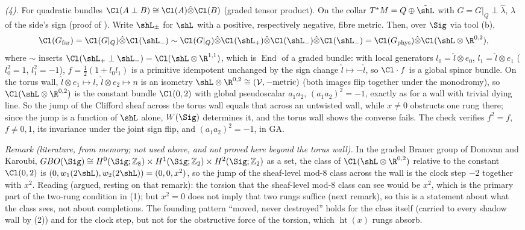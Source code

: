 \emph{(4).} For quadratic bundles $\Cl(A \perp B) \cong \Cl(A) \hat\otimes \Cl(B)$ (graded tensor product). On the collar $T^*M = Q \oplus \tilde\shL$ with $G = G|_Q \perp \hat\lambda$, $\hat\lambda$ of the side's sign (proof of ). Write $\shL_\pm$ for $\shL$ with a positive, respectively negative, fibre metric. Then, over $\Sig$ via tool (b),
\[
\Cl(G_{\mathrm{far}}) = \Cl(G|_Q) \hat\otimes \Cl(\shL_-) \sim \Cl(G|_Q) \hat\otimes \Cl(\shL_+) \hat\otimes \Cl(\shL_-) \hat\otimes \Cl(\shL_-) = \Cl(G_{\mathrm{phys}}) \hat\otimes \Cl(\shL \otimes \R^{0,2}),
\]
where $\sim$ inserts $\Cl(\shL_+ \perp \shL_-) = \Cl(\shL \otimes \R^{1,1})$, which is $\operatorname{End}$ of a graded bundle: with local generators $l_0 = \hat l \otimes e_0$, $l_1 = \hat l \otimes e_1$ ($l_0^2 = 1$, $l_1^2 = -1$), $f = \frac12(1 + l_0 l_1)$ is a primitive idempotent unchanged by the sign change $\hat l \mapsto -\hat l$, so $\Cl \cdot f$ is a global spinor bundle. On the torus wall, $\hat l \otimes e_1 \mapsto l$, $\hat l \otimes e_2 \mapsto n$ is an isometry $\shL \otimes \R^{0,2} \cong (\mathcal V, -\text{metric})$ (both images flip together under the monodromy), so $\Cl(\shL \otimes \R^{0,2})$ is the constant bundle $\Cl(0,2)$ with global pseudoscalar $a_1 a_2$, $(a_1 a_2)^2 = -1$, exactly as for a wall with trivial dying line. So the jump of the Clifford sheaf across the torus wall equals that across an untwisted wall, while $x \neq 0$ obstructs one rung there; since the jump is a function of $\shL$ alone, $W(\Sig)$ determines it, and the torus wall shows the converse fails. The check verifies $f^2 = f$, $f \neq 0, 1$, its invariance under the joint sign flip, and $(a_1a_2)^2 = -1$, in GA.

\emph{Remark (literature, from memory; not used above, and not proved here beyond the torus wall).} In the graded Brauer group of Donovan and Karoubi, $GBO(\Sig) \cong H^0(\Sig;\mathbb{Z}_8) \times H^1(\Sig;\mathbb{Z}_2) \times H^2(\Sig;\mathbb{Z}_2)$ as a set, the class of $\Cl(\shL \otimes \R^{0,2})$ relative to the constant $\Cl(0,2)$ is $(0, w_1(2\shL), w_2(2\shL)) = (0, 0, x^{2})$, so the jump of the sheaf-level mod-8 class across the wall is the clock step $-2$ together with $x^2$. Reading (argued, resting on that remark): the torsion that the sheaf-level mod-8 class can see would be $x^2$, which is the primary part of the two-rung condition in (1); but $x^{2} = 0$ does not imply that two rungs suffice (next remark), so this is a statement about what the class sees, not about completions. The founding pattern ``moved, never destroyed'' holds for the class itself (carried to every shadow wall by (2)) and for the clock step, but not for the obstructive force of the torsion, which $\operatorname{ht}(x)$ rungs absorb.


